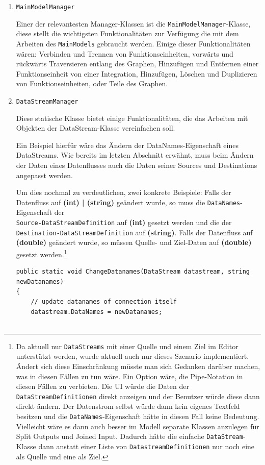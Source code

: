 \begin{enumerate}
	\item\texttt{MainModelManager}
	
	Einer der relevantesten Manager-Klassen ist die \texttt{MainModelManager}-Klasse,
	diese stellt die wichtigsten Funktionalitäten zur Verfügung die mit dem
	Arbeiten des \texttt{MainModels} gebraucht werden. Einige dieser Funktionalitäten
	wären: Verbinden und Trennen von Funktionseinheiten, vorwärts und rückwärts
	Traversieren entlang des Graphen, Hinzufügen und Entfernen einer
	Funktionseinheit von einer Integration, Hinzufügen, Löschen und Duplizieren
	von Funktionseinheiten, oder Teile des Graphen.
	
	\item\texttt{DataStreamManager}
	
	Diese statische Klasse bietet einige Funktionalitäten, die das Arbeiten mit
	Objekten der DataStream-Klasse vereinfachen soll.
	
	Ein Beispiel hierfür wäre das Ändern der DataNames-Eigenschaft eines DataStreams. 
	Wie bereits im letzten Abschnitt erwähnt, muss beim Ändern der Daten
	eines Datenflusses auch die Daten seiner Sources und Destinations
	angepasst werden. 
	
	Um dies nochmal zu verdeutlichen, zwei konkrete Beispiele:
	Falls der Datenfluss auf \textbf{(int) | (string) } geändert wurde, so muss die \texttt{DataNames}-Eigenschaft der \\\texttt{Source-DataStreamDefinition} auf
  \textbf{(int)} gesetzt werden und die der
	\\\texttt{Destination-DataStreamDefinition} auf \textbf{(string)}. 
	Falls der Datenfluss auf \textbf{(double)} geändert wurde, so müssen Quelle-
	und Ziel-Daten auf \textbf{(double)} gesetzt werden.\footnote{Da aktuell nur \texttt{DataStreams} mit einer Quelle und einem Ziel im Editor unterstützt		
		werden, wurde aktuell auch nur dieses Szenario implementiert. Ändert sich
		diese Einschränkung müsste man sich Gedanken darüber machen, was in diesen
		Fällen zu tun wäre. Ein Option wäre, die Pipe-Notation in diesen Fällen zu
		verbieten. Die UI würde die Daten der \texttt{DataStreamDefinitionen} direkt
		anzeigen und der Benutzer würde diese dann direkt ändern. Der Datenstrom
		selbst würde dann kein eigenes Textfeld besitzen und die \texttt{DataNames}-Eigenschaft hätte in diesen Fall keine Bedeutung. 
		Vielleicht wäre es dann auch besser im Modell separate Klassen
		anzulegen für Split Outputs und Joined Input. Dadurch hätte die
		einfache \texttt{DataStream}-Klasse dann anstatt einer Liste von \texttt{DatastreamDefinitionen} nur noch eine als Quelle und eine als Ziel.}
\\	
	\begin{lstlisting}[caption=\texttt{ChangeDatanames}-Methode]
public static void ChangeDatanames(DataStream datastream, string newDatanames)
{
	// update datanames of connection itself
	datastream.DataNames = newDatanames;
	

\end{lstlisting}
\end{enumerate}
